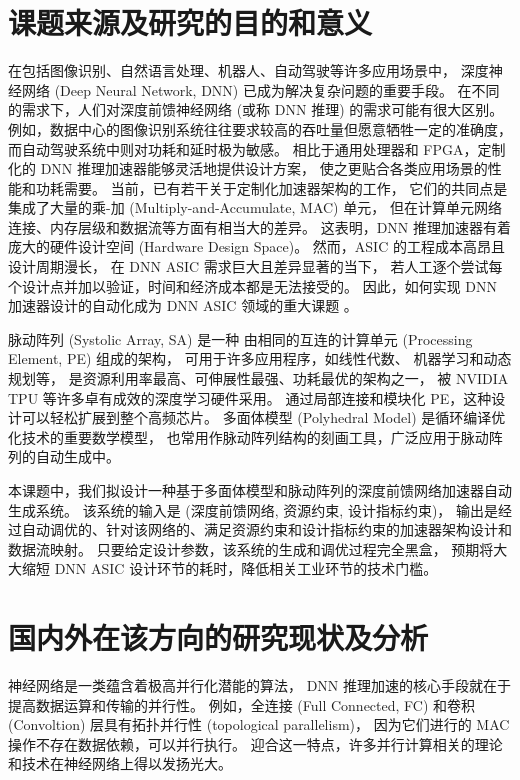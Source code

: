 \section{课题来源及研究的目的和意义}

在包括图像识别、自然语言处理、机器人、自动驾驶等许多应用场景中，
深度神经网络 (Deep Neural Network, DNN) 已成为解决复杂问题的重要手段。
在不同的需求下，人们对深度前馈神经网络 (或称 DNN 推理) 的需求可能有很大区别。
例如，数据中心的图像识别系统往往要求较高的吞吐量但愿意牺牲一定的准确度，
而自动驾驶系统中则对功耗和延时极为敏感。
相比于通用处理器和 FPGA，定制化的 DNN 推理加速器能够灵活地提供设计方案，
使之更贴合各类应用场景的性能和功耗需要。
当前，已有若干关于定制化加速器架构的工作，
它们的共同点是集成了大量的乘-加 (Multiply-and-Accumulate, MAC) 单元，
但在计算单元网络连接、内存层级和数据流等方面有相当大的差异。
这表明，DNN 推理加速器有着庞大的硬件设计空间 (Hardware Design Space)。
然而，ASIC 的工程成本高昂且设计周期漫长，
在 DNN ASIC 需求巨大且差异显著的当下，
若人工逐个尝试每个设计点并加以验证，时间和经济成本都是无法接受的。
因此，如何实现 DNN 加速器设计的自动化成为 DNN ASIC 领域的重大课题 \cite{capra_hardware_2020}。

脉动阵列 (Systolic Array, SA) 是一种
由相同的互连的计算单元 (Processing Element, PE) 组成的架构，
可用于许多应用程序，如线性代数\cite{moss_customizable_2018}、
机器学习\cite{jouppi_-datacenter_2017}和动态规划\cite{khailany_accelerating_2020}等，
是资源利用率最高、可伸展性最强、功耗最优的架构之一，
被 NVIDIA TPU 等许多卓有成效的深度学习硬件采用。
通过局部连接和模块化 PE，这种设计可以轻松扩展到整个高频芯片。
多面体模型 (Polyhedral Model) 是循环编译优化技术的重要数学模型\cite{hutchison_polyhedral_2010,rauchwerger_putting_2004}，
也常用作脉动阵列结构的刻画工具，广泛应用于脉动阵列的自动生成中。

本课题中，我们拟设计一种基于多面体模型和脉动阵列的深度前馈网络加速器自动生成系统。
该系统的输入是 (深度前馈网络, 资源约束, 设计指标约束)，
输出是经过自动调优的、针对该网络的、满足资源约束和设计指标约束的加速器架构设计和数据流映射。
只要给定设计参数，该系统的生成和调优过程完全黑盒，
预期将大大缩短 DNN ASIC 设计环节的耗时，降低相关工业环节的技术门槛。

\section{国内外在该方向的研究现状及分析}

神经网络是一类蕴含着极高并行化潜能的算法，
DNN 推理加速的核心手段就在于提高数据运算和传输的并行性。
例如，全连接 (Full Connected, FC) 和卷积 (Convoltion) 层具有拓扑并行性 (topological parallelism)，
因为它们进行的 MAC 操作不存在数据依赖，可以并行执行。
迎合这一特点，许多并行计算相关的理论和技术在神经网络上得以发扬光大\cite{sze_efficient_2017}。

